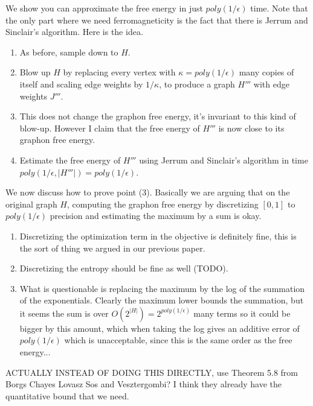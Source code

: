 \documentclass[final, 12pt]{colt2018}
\theoremstyle{definition}
\theoremstyle{plain}
\begin{document}
We show you can approximate the free energy in just $poly(1/\epsilon)$ time. Note that the only part where we need ferromagneticity is the fact that there is Jerrum and Sinclair's algorithm. Here is the idea.
\begin{enumerate}
\item As before, sample down to $H$.
\item Blow up $H$ by replacing every vertex with $\kappa = poly(1/\epsilon)$
  many copies of itself and scaling edge weights by $1/\kappa$, to produce a graph $H'''$ with edge weights $J'''$.
\item This does not change the graphon free energy, it's invariant
to this kind of blow-up. However I claim that the free energy
of $H'''$ is now close to its graphon free energy.
\item Estimate the free energy of $H'''$ using Jerrum and Sinclair's
algorithm in time $poly(1/\epsilon, |H'''|) = poly(1/\epsilon)$.
\end{enumerate}
We now discuss how to prove point (3). Basically we are arguing
that on the original graph $H$, computing the graphon free energy
by discretizing $[0,1]$ to $poly(1/\epsilon)$ precision and
estimating the maximum by a sum is okay.
\begin{enumerate}
\item Discretizing the optimization term in the objective is
  definitely fine, this is the sort of thing we argued in our previous
  paper.
\item Discretizing the entropy should be fine as well (TODO).
\item What is questionable is replacing the maximum by the log of the
  summation of the exponentials.  Clearly the maximum lower bounds the
  summation, but it seems the sum is over
  $O(2^{|H|}) = 2^{poly(1/\epsilon)}$ many terms so it could be bigger
  by this amount, which when taking the log gives an additive error of
  $poly(1/\epsilon)$ which is unacceptable, since this is the same order
  as the free energy...

\end{enumerate}

ACTUALLY INSTEAD OF DOING THIS DIRECTLY, use Theorem 5.8 from Borgs Chayes Lovasz Sos and Vesztergombi? I think they already have the quantitative bound that we need.
\end{document}
